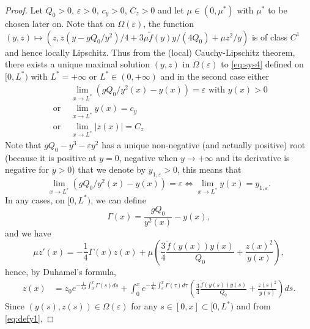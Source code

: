 \documentclass[10pt,a4paper]{amsart}
\begin{document}
\begin{proof}
Let $Q_{0}>0$, $\varepsilon>0$, $c_{y}>0$, $C_{z}>0$ and let $\mu\in(0,\mu^{*})$ with $\mu^{*}$ to be chosen later on. {Note that on $\Omega(\varepsilon)$, the function $(y,z)\mapsto (z, z(y-gQ_{0}/y^{2})/4+3\mu\tilde{f}(y)y/(4Q_{0})+\mu z^{2}/y)$ is of class $C^{1}$ and hence locally Lipschitz. Thus from} the {(local)} Cauchy-Lipschitz theorem, 
there exists a unique maximal solution $(y, z)$ in $\Omega(\varepsilon)$ to \eqref{eq:sys4} defined 
on $[0,L^{*})$ with $L^{*}=+\infty$ or $L^{*}\in(0,+\infty)$ and in {the second} case either
\begin{equation}
\label{eq:boundslim}
\begin{split}
&\lim\limits_{x\rightarrow L^{*}}(gQ_{0}/y^{2}(x)-y(x)) =\varepsilon\text{ with }y(x)> 0\\
\text{ or }&\lim\limits_{x\rightarrow L^{*}}y(x) = c_{y}\\
\text{ or }&\lim\limits_{x\rightarrow L^{*}}|z(x)| = C_{z}
\end{split}
\end{equation}
Note that $gQ_{0}-y^{3}-\varepsilon y^{2}$ has a unique non-negative (and actually positive) root (because it is positive at $y=0$, negative when $y \to +\infty$ and its derivative is negative for $y > 0$) that we denote by $y_{1,\varepsilon}>0$, this means that 
\begin{equation}
\label{eq:defy1}
\lim\limits_{x\rightarrow L^{*}}(gQ_{0}/y^{2}(x)-y(x)) =\varepsilon \iff
   \lim\limits_{x\rightarrow L^{*}}y(x) = y_{1,\varepsilon}.
\end{equation}
In any cases, on $[0,L^{*})$, we can define 
\begin{equation}
\label{eq:defg}
{\Gamma(x)} =\frac{gQ_{0}}{y^{2}(x)}-y(x),
\end{equation}
and we have
\begin{equation}
    \mu z'(x) = -\frac{1}{4}{\Gamma(x)}z(x)+\mu\left(\frac{3}{4}\frac{\tilde{f}(y(x))y(x)}{Q_{0}}+\frac{z(x)^{2}}{y(x)}\right),
\end{equation}
hence, by Duhamel's formula,
\begin{equation}
\begin{split}
    z(x) &= z_{0} e^{-\frac{1}{4\mu}\int_{0}^{x}{\Gamma(s)}ds}+  \int_{0}^{x}e^{-\frac{1}{4\mu}\int_{s}^{x}{\Gamma(\tau)}d\tau}\left(\frac{3}{4}\frac{\tilde{f}(y(s))y(s)}{Q_{0}}+\frac{z(s)^{2}}{y(s)}\right) ds.
\end{split}
\end{equation}
Since $(y(s),z(s))\in \Omega(\varepsilon)$ for any $s\in [0,x]\subset[0,L^{*})$ and from \eqref{eq:defy1},

\end{proof}
\end{document}
